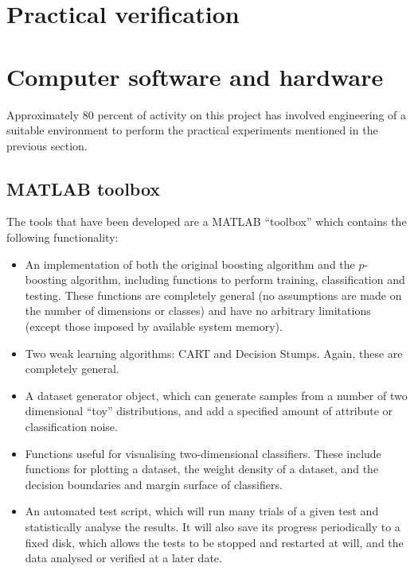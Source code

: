 \section{Practical verification}

\section{Computer software and hardware}
Approximately 80 percent of activity on this project has involved
engineering of a suitable environment to perform the practical
experiments mentioned in the previous section.

\subsection{MATLAB toolbox}
The tools that have been developed are a MATLAB ``toolbox'' which
contains the following functionality:

\begin{itemize}
\item	An implementation of both the original boosting algorithm and
	the $p$-boosting algorithm, including functions to perform
	training, classification and testing.  These functions are
	completely general (no assumptions are made on the number of
	dimensions or classes) and have no arbitrary limitations
	(except those imposed by available system memory).

\item	Two weak learning algorithms: CART and Decision Stumps.
	Again, these are completely general.

\item	A dataset generator object, which can generate samples from a
	number of two dimensional ``toy'' distributions, and add a
	specified amount of attribute or classification noise.

\item	Functions useful for visualising two-dimensional classifiers.
	These include functions for plotting a dataset, the weight
	density of a dataset, and the decision boundaries and margin
	surface of classifiers.

\item	An automated test script, which will run many trials of a
	given test and statistically analyse the results.  It will
	also save its progress periodically to a fixed disk, which
	allows the tests to be stopped and restarted at will, and the
	data analysed or verified at a later date.
\end{itemize}

